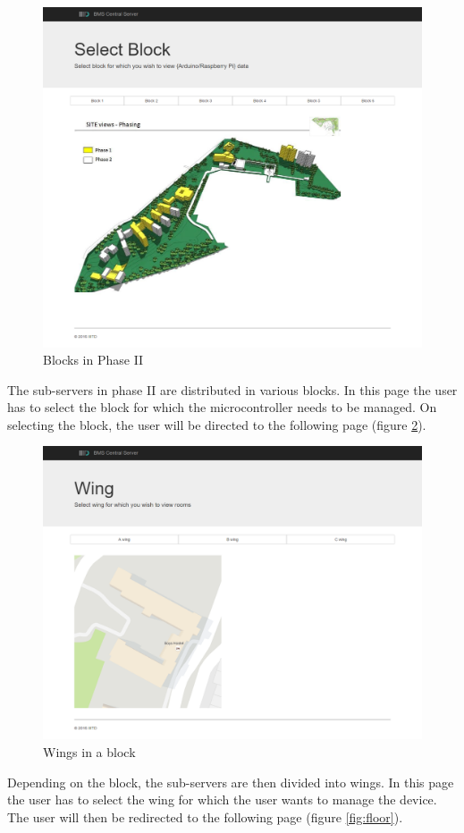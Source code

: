 \documentclass[letterpaper,11pt]{report}
\begin{document}
\newpage
\begin{figure}[h]
\includegraphics[width=\textwidth]{block}
\centering
\captionsetup{justification=centering}
\caption{Blocks in Phase II}
\label{fig:block}
\end{figure}
The sub-servers in phase II are distributed in various blocks. In this page the user has to select the block for which the microcontroller needs to be managed. On selecting the block, the user will be directed to the following page (figure \ref{fig:wing}).

\newpage
\begin{figure}[h]
\includegraphics[width=\textwidth]{wing}
\centering
\captionsetup{justification=centering}
\caption{Wings in a block}
\label{fig:wing}
\end{figure}
Depending on the block, the sub-servers are then divided into wings. In this page the user has to select the wing for which the user wants to manage the device. The user will then be redirected to the following page (figure \ref{fig:floor}).
\end{document}
